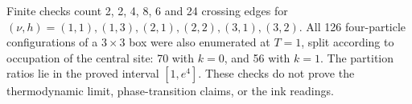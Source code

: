 \documentclass[11pt]{article}
\begin{document}
Finite checks count 2, 2, 4, 8, 6 and 24 crossing edges for \((\nu,h)=(1,1),(1,3),(2,1),(2,2),(3,1),(3,2)\). All 126 four-particle configurations of a \(3\times3\) box were also enumerated at \(T=1\), split according to occupation of the central site: 70 with \(k=0\), and 56 with \(k=1\). The partition ratios lie in the proved interval \([1,e^4]\). These checks do not prove the thermodynamic limit, phase-transition claims, or the ink readings.
\end{document}
